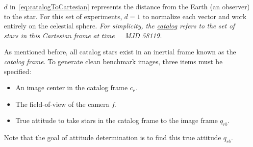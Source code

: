 $d$ in~\autoref{eq:catalogToCartesian} represents the distance from the Earth (an observer) to the star.
For this set of experiments, $d = 1$ to normalize each vector and work entirely on the celestial sphere.
\textit{For simplicity, the \underline{catalog} refers to the set of stars in this Cartesian frame at time = MJD 58119.}

As mentioned before, all catalog stars exist in an inertial frame known as the \textit{catalog frame}.
To generate clean benchmark images, three items must be specified:
\begin{itemize}
    \item An image center in the catalog frame $c_r$.
    \item The field-of-view of the camera $f$.
    \item True attitude to take stars in the catalog frame to the image frame $q_{rb}$.
\end{itemize}

Note that the goal of attitude determination is to find this true attitude $q_{rb}$.

\begin{figure}
\end{figure}


